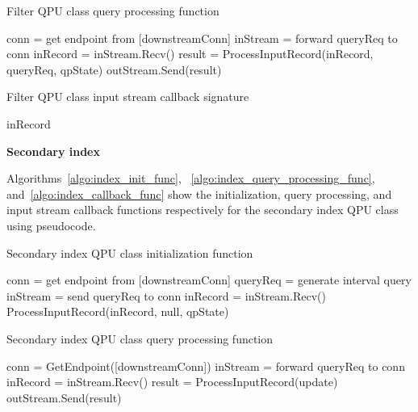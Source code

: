 \begin{algorithm}
\caption{Filter QPU class query processing function}
\label{algo:filter_query_processing_func}
\begin{algorithmic}
\State conn = get endpoint from [downstreamConn] 
\State inStream = forward queryReq to conn
\State inRecord = inStream.Recv()
\State result = ProcessInputRecord(inRecord, queryReq, qpState)
\State outStream.Send(result)
\EndIf
\EndWhile
\EndFunction
\end{algorithmic}
\end{algorithm}

\begin{algorithm}
\caption{Filter QPU class input stream callback signature}
\label{algo:filter_algorithm_func}
\begin{algorithmic}
\State \Return inRecord
\Else
\State \Return []
\EndIf
\EndFunction
\end{algorithmic}
\end{algorithm}


\bigskip
\noindent
\textbf{Secondary index}

Algorithms~\ref{algo:index_init_func}, ~\ref{algo:index_query_processing_func}, and~\ref{algo:index_callback_func}
show the initialization, query processing, and input stream callback functions respectively for the secondary index QPU
class using pseudocode.

\begin{algorithm}
\caption{Secondary index QPU class initialization function}
\label{algo:index_init_func}
\begin{algorithmic}
\State conn = get endpoint from [downstreamConn] 
\State queryReq = generate interval query
\State inStream = send queryReq to conn
\State inRecord = inStream.Recv()
\State ProcessInputRecord(inRecord, null, qpState)
\EndWhile
\EndFunction
\end{algorithmic}
\end{algorithm}

\begin{algorithm}
\caption{Secondary index QPU class query processing function}
\label{algo:index_query_processing_func}
\begin{algorithmic}
\State conn = GetEndpoint([downstreamConn]) 
\State inStream = forward queryReq to conn
\State inRecord = inStream.Recv()
\State result = ProcessInputRecord(update)
\State outStream.Send(result)
\EndIf
\EndWhile
\EndFunction
\end{algorithmic}
\end{algorithm}

